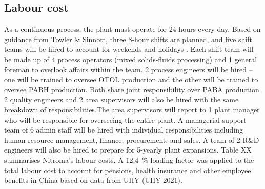 \subsection{Labour cost}
As a continuous process, the plant must operate for 24 hours every day. Based on guidance from Towler \& Sinnott, three 8-hour shifts are planned, and five shift teams will be hired to account for weekends and holidays \cite{sinnott_chemical_2020}. Each shift team will be made up of 4 process operators (mixed solids-fluids processing) and 1 general foreman to overlook affairs within the team. 2 process engineers will be hired – one will be trained to oversee OTOL production and the other will be trained to oversee PABH production. Both share joint responsibility over PABA production. 2 quality engineers and 2 area supervisors will also be hired with the same breakdown of responsibilities.The area supervisors will report to 1 plant manager who will be responsible for overseeing the entire plant. A managerial support team of 6 admin staff will be hired with individual responsibilities including human resource management, finance, procurement, and sales. A team of 2 R\&D engineers will also be hired to prepare for 5-yearly plant expansions.
Table XX summarises Nitroma's labour costs. A \SI{12.4}{\percent} loading factor was applied to the total labour cost to account for pensions, health insurance and other employee benefits in China based on data from UHY (UHY 2021).


